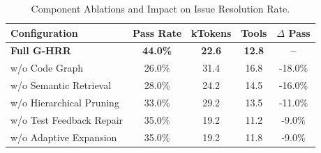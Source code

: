 \begin{table}[t]
\centering
\small
\caption{Component Ablations and Impact on Issue Resolution Rate.}
\label{tab:ablations}
\begin{tabular}{lcccc}
\toprule
\textbf{Configuration} & \textbf{Pass Rate} & \textbf{kTokens} & \textbf{Tools} & \textbf{$\Delta$ Pass} \\
\midrule
\textbf{Full G-HRR} & \textbf{44.0\%} & \textbf{22.6} & \textbf{12.8} & \textbf{--} \\
w/o Code Graph & 26.0\% & 31.4 & 16.8 & -18.0\% \\
w/o Semantic Retrieval & 28.0\% & 24.2 & 14.5 & -16.0\% \\
w/o Hierarchical Pruning & 33.0\% & 29.2 & 13.5 & -11.0\% \\
w/o Test Feedback Repair & 35.0\% & 19.2 & 11.2 & -9.0\% \\
w/o Adaptive Expansion & 35.0\% & 19.2 & 11.8 & -9.0\% \\
\bottomrule
\end{tabular}
\end{table}